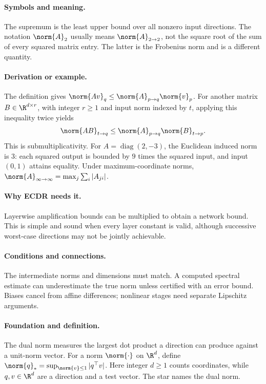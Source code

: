 \paragraph{Symbols and meaning.}
The supremum is the least upper bound over all nonzero input directions.
The notation $\norm{A}_2$ usually means $\norm{A}_{2\to2}$, not
the square root of the sum of every squared matrix entry. The latter is
the Frobenius norm and is a different quantity.
\paragraph{Derivation or example.}
The definition gives $\norm{Av}_q\le\norm{A}_{p\to q}\norm{v}_p$.
For another matrix $B\in\R^{d\times r}$, with integer $r\ge1$ and
input norm indexed by $t$, applying this inequality twice yields
\[
 \norm{AB}_{t\to q}
 \le\norm{A}_{p\to q}\norm{B}_{t\to p}.
\]
This is submultiplicativity. For
$A=\operatorname{diag}(2,-3)$, the Euclidean induced norm is $3$:
each squared output is bounded by $9$ times the squared input, and
input $(0,1)$ attains equality. Under maximum-coordinate norms,
$\norm{A}_{\infty\to\infty}=\max_j\sum_i|A_{ji}|$.
\paragraph{Why ECDR needs it.}
Layerwise amplification bounds can be multiplied to obtain a network
bound. This is simple and sound when every layer constant is valid,
although successive worst-case directions may not be jointly achievable.
\paragraph{Conditions and connections.}
The intermediate norms and dimensions must match. A computed spectral
estimate can underestimate the true norm unless certified with an error
bound. Biases cancel from affine differences; nonlinear stages need
separate Lipschitz arguments.

\paragraph{Foundation and definition.}
The dual norm measures the largest dot product a direction can produce
against a unit-norm vector. For a norm $\norm{\cdot}$ on $\R^d$,
define $\norm{q}_*=\sup_{\norm{v}\le1}|q^\top v|$.
Here integer $d\ge1$ counts coordinates, while $q,v\in\R^d$ are
a direction and a test vector. The star names the dual norm.
